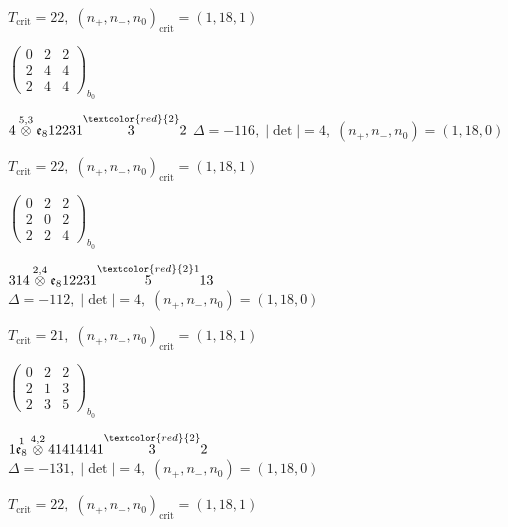 \documentclass[10pt]{article}
\begin{document}
\hspace{1em}$T_{\text{crit}}=22,\; (n_+,n_-,n_0)_{\text{crit}}=(1,18,1)$

\hspace{2em}$\left(\begin{smallmatrix}0 & 2 & 2 \\ 2 & 4 & 4 \\ 2 & 4 & 4\end{smallmatrix}\right)_{\!b_0}$

\smallskip

$4\overset{5,3}{\otimes}\mathfrak{e}_812231\overset{\textcolor{red}{2}}{3}2$ \quad $\Delta=-116,\; |\det|=4,\; (n_+,n_-,n_0)=(1,18,0)$

\hspace{1em}$T_{\text{crit}}=22,\; (n_+,n_-,n_0)_{\text{crit}}=(1,18,1)$

\hspace{2em}$\left(\begin{smallmatrix}0 & 2 & 2 \\ 2 & 0 & 2 \\ 2 & 2 & 4\end{smallmatrix}\right)_{\!b_0}$

\smallskip

$314\overset{2,4}{\otimes}\mathfrak{e}_812231\overset{\textcolor{red}{2}1}{5}13$ \quad $\Delta=-112,\; |\det|=4,\; (n_+,n_-,n_0)=(1,18,0)$

\hspace{1em}$T_{\text{crit}}=21,\; (n_+,n_-,n_0)_{\text{crit}}=(1,18,1)$

\hspace{2em}$\left(\begin{smallmatrix}0 & 2 & 2 \\ 2 & 1 & 3 \\ 2 & 3 & 5\end{smallmatrix}\right)_{\!b_0}$

\smallskip

$1\overset{1}{\mathfrak{e}_8}\overset{4,2}{\otimes}41414141\overset{\textcolor{red}{2}}{3}2$ \quad $\Delta=-131,\; |\det|=4,\; (n_+,n_-,n_0)=(1,18,0)$

\hspace{1em}$T_{\text{crit}}=22,\; (n_+,n_-,n_0)_{\text{crit}}=(1,18,1)$
\end{document}
